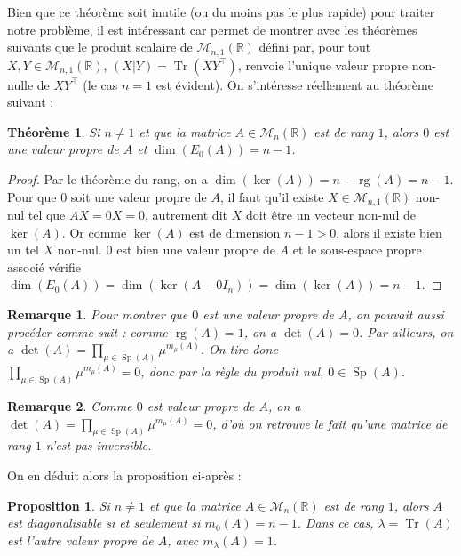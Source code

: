 \documentclass[a4paper]{article}
\newtheorem*{theorem}{Théorème}
\newtheorem*{remark}{Remarque}
\newtheorem*{proposition}{Proposition}
\begin{document}
Bien que ce théorème soit inutile (ou du moins pas le plus rapide) pour traiter notre problème, il est intéressant car permet de montrer avec les théorèmes suivants que le produit scalaire de $\mathcal{M}_{n, 1}(\mathbb{R})$ défini par, pour tout $X, Y \in \mathcal{M}_{n, 1}(\mathbb{R})$, $(X|Y) = \operatorname{Tr}\left(XY^\top\right)$, renvoie l'unique valeur propre non-nulle de $XY^\top$ (le cas $n=1$ est évident).
On s'intéresse réellement au théorème suivant :

\begin{theorem}
    Si $n \neq 1$ et que la matrice $A \in \mathcal{M}_{n}(\mathbb{R})$ est de rang $1$, alors $0$ est une valeur propre de $A$ et $\dim(E_0(A)) = n-1$.
\end{theorem}

\begin{proof}
    Par le théorème du rang, on a $\dim(\ker(A)) = n - \operatorname{rg}(A) = n-1$.
    Pour que $0$ soit une valeur propre de $A$, il faut qu'il existe $X \in \mathcal{M}_{n,1}(\mathbb{R})$ non-nul tel que $AX = 0X = 0$, autrement dit $X$ doit être un vecteur non-nul de $\ker(A)$. Or comme $\ker(A)$ est de dimension $n-1 > 0$, alors il existe bien un tel $X$ non-nul. $0$ est bien une valeur propre de $A$ et le sous-espace propre associé vérifie $\dim(E_0(A)) = \dim(\ker(A-0 I_n)) = \dim(\ker(A)) = n-1$.
\end{proof}

\begin{remark}
    Pour montrer que $0$ est une valeur propre de $A$, on pouvait aussi procéder comme suit : comme $\operatorname{rg}(A)=1$, on a $\det(A) = 0$. Par ailleurs, on a $\displaystyle \det(A) = \!\!\!\!\!\! \prod_{\mu \in \operatorname{Sp}(A)} \!\!\!\!\! \mu^{m_\mu(A)}$. On tire donc \\$\displaystyle \prod_{\mu \in \operatorname{Sp}(A)}  \!\!\!\!\! \mu^{m_\mu(A)} = 0$, donc par la règle du produit nul, $0 \in \operatorname{Sp}(A)$.
\end{remark}

\begin{remark}
    Comme $0$ est valeur propre de $A$, on a $\displaystyle \det(A) = \!\!\!\!\!\! \prod_{\mu \in \operatorname{Sp}(A)} \!\!\!\!\! \mu^{m_\mu(A)} = 0$, d'où on retrouve le fait qu'une matrice de rang $1$ n'est pas inversible.
\end{remark}

On en déduit alors la proposition ci-après :

\begin{proposition}
    Si $n \neq 1$ et que la matrice $A \in \mathcal{M}_{n}(\mathbb{R})$ est de rang $1$, alors $A$ est diagonalisable si et seulement si $m_0(A) = n-1$. Dans ce cas, $\lambda = \operatorname{Tr}(A)$ est l'autre valeur propre de $A$, avec $m_\lambda(A) = 1$.
\end{proposition}
\end{document}
